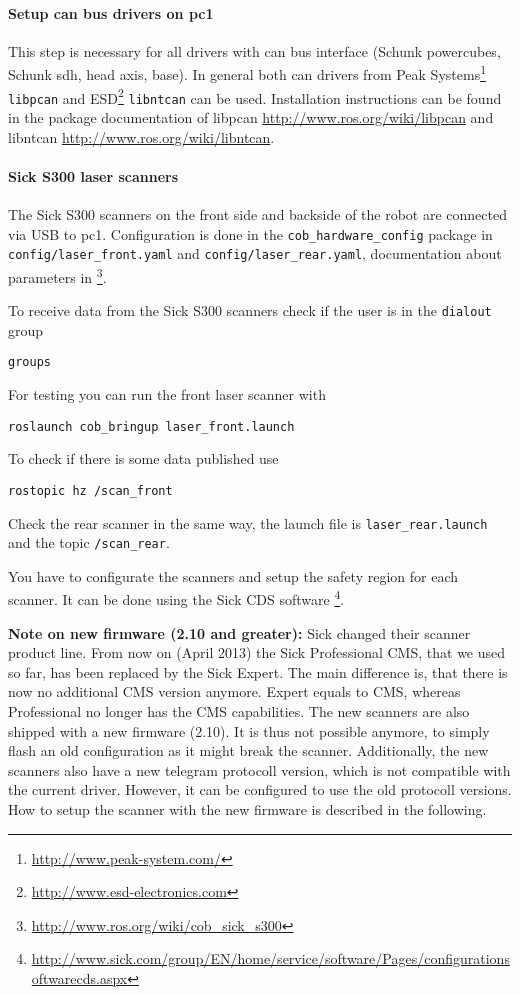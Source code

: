 \paragraph{Setup can bus drivers on pc1}
This step is necessary for all drivers with can bus interface (Schunk powercubes, Schunk sdh, head axis, base). In general both can drivers from Peak Systems\footnote{\url{http://www.peak-system.com/}} \texttt{libpcan} and ESD\footnote{\url{http://www.esd-electronics.com}} \texttt{libntcan} can be used. Installation instructions can be found in the package documentation of libpcan \url{http://www.ros.org/wiki/libpcan} and libntcan \url{http://www.ros.org/wiki/libntcan}.

\paragraph{Sick S300 laser scanners}
The Sick S300 scanners on the front side and backside of the robot are connected via USB to pc1. Configuration is done in the \texttt{cob\_hardware\_config} package in \texttt{config/laser\_front.yaml} and \texttt{config/laser\_rear.yaml}, documentation about parameters in \footnote{\url{http://www.ros.org/wiki/cob_sick_s300}}.

To receive data from the Sick S300 scanners check if the user is in the \texttt{dialout} group
\begin{lstlisting}
groups
\end{lstlisting}

For testing you can run the front laser scanner with
\begin{lstlisting}
roslaunch cob_bringup laser_front.launch
\end{lstlisting}

To check if there is some data published use
\begin{lstlisting}
rostopic hz /scan_front
\end{lstlisting}

Check the rear scanner in the same way, the launch file is \texttt{laser\_rear.launch} and the topic \texttt{/scan\_rear}.

You have to configurate the scanners and setup the safety region for each scanner. It can be done using the Sick CDS software \footnote{\url{http://www.sick.com/group/EN/home/service/software/Pages/configurationsoftwarecds.aspx}}.

\textbf{Note on new firmware (2.10 and greater):} 
Sick changed their scanner product line. From now on (April 2013) the Sick Professional CMS, that we used so far, has been replaced by the Sick Expert.
The main difference is, that there is now no additional CMS version anymore.
Expert equals to CMS, whereas Professional no longer has the CMS capabilities.
The new scanners are also shipped with a new firmware (2.10).
It is thus not possible anymore, to simply flash an old configuration as it might break the scanner.
Additionally, the new scanners also have a new telegram protocoll version, which is not compatible with the current driver.
However, it can be configured to use the old protocoll versions.
How to setup the scanner with the new firmware is described in the following.

